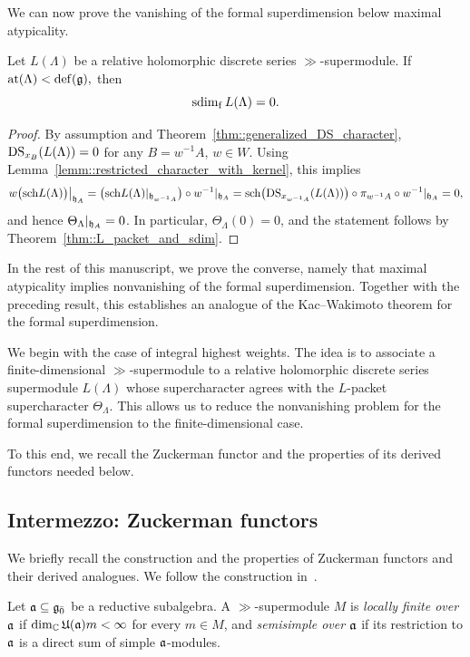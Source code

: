 We can now prove the vanishing of the formal superdimension below maximal atypicality.

\begin{theorem}\label{thm::vanishing_sdim_less_atypic}
Let $L(\Lambda)$ be a relative holomorphic discrete series $\gg$-supermodule. If
$
\at(\Lambda)<\defect(\gg),
$
then
\[
\fsdim L(\Lambda)=0.
\]
\end{theorem}

\begin{proof} By assumption and Theorem~\ref{thm::generalized_DS_character}, 
$\DS_{x_{B}}(L(\Lambda))=0$ for any $B=w^{-1}A$, $w \in W$. Using Lemma~\ref{lemm::restricted_character_with_kernel}, this implies
\[
w\bigl(\sch L(\Lambda)\bigr)\big|_{\hh_A}
=
\bigl(\sch L(\Lambda)|_{\hh_{w^{-1}A}}\bigr)\circ w^{-1}|_{\hh_A}=
\sch\bigl(\DS_{x_{w^{-1}A}}(L(\Lambda))\bigr)\circ\pi_{w^{-1}A}\circ w^{-1}|_{\hh_A}
=0,
\]
and hence $\Theta_{\Lambda}\vert_{\hh_{A}}=0$. In particular, $\Theta_\Lambda(0)=0$, and the statement follows by Theorem~\ref{thm::L_packet_and_sdim}.
\end{proof}

In the rest of this manuscript, we prove the converse, namely that maximal atypicality implies nonvanishing of the formal superdimension. Together with the preceding result, this establishes an analogue of the Kac--Wakimoto theorem for the formal superdimension.

We begin with the case of integral highest weights. The idea is to associate a finite-dimensional $\gg$-supermodule to a relative holomorphic discrete series supermodule $L(\Lambda)$ whose supercharacter agrees with the $L$-packet supercharacter $\Theta_\Lambda$. This allows us to reduce the nonvanishing problem for the formal superdimension to the finite-dimensional case.

To this end, we recall the Zuckerman functor and the properties of its derived functors needed below.


\subsection{Intermezzo: Zuckerman functors}
\label{subsec::Zuckerman_functors} 
We briefly recall the construction and the properties of Zuckerman functors and their derived analogues. We follow the construction in~\cite[Section~2]{coulembier2016bott}.

Let $\aa\subseteq\even$ be a reductive subalgebra. A $\gg$-supermodule $M$ is \emph{locally finite over $\aa$} if $\dim_{\CC}\UE(\aa)m<\infty$ for every $m\in M$, and \emph{semisimple over $\aa$} if its restriction to $\aa$ is a direct sum of simple $\aa$-modules. 


